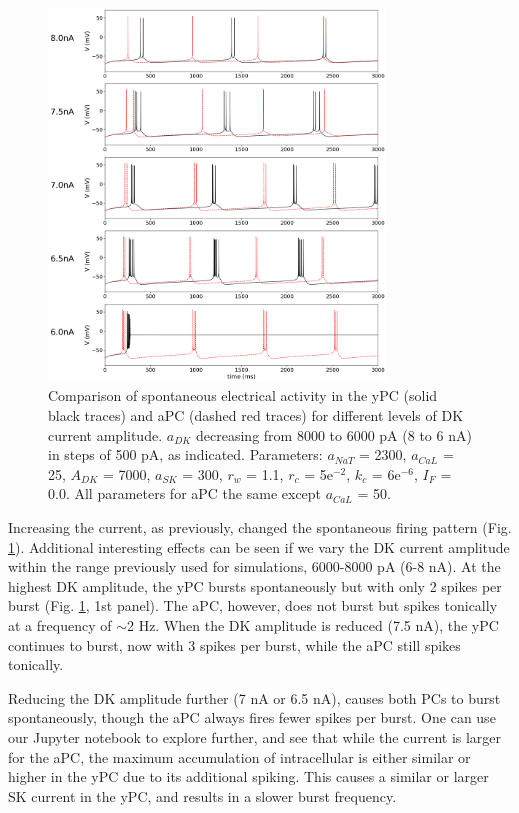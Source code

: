 \documentclass[12pt]{article}
\begin{document}
\begin{figure}[h!]
\centering
\includegraphics[width=0.8\textwidth]{figures/fig4.png}
\caption{Comparison of spontaneous electrical activity in the yPC (solid black traces) and aPC (dashed red traces) for different levels of DK current amplitude. $a_{DK}$ decreasing from 8000 to 6000 pA (8 to 6 nA) in steps of 500 pA, as indicated. Parameters: $a_{NaT}$ = 2300, $a_{CaL}$ = 25, $A_{DK}$ = 7000, $a_{SK}$ = 300, $r_{w}$ = 1.1, $r_{c}$ = 5e$^{-2}$, $k_{c}$ = 6e$^{-6}$, $I_{F}$ = 0.0. All parameters for aPC the same except $a_{CaL}$ = 50.}
\label{fig:burstingAging}
\end{figure}

Increasing the {\Ca} current, as previously, changed the spontaneous firing pattern (Fig. \ref{fig:burstingAging}). Additional interesting effects can be seen if we vary the DK current amplitude within the range previously used for simulations, 6000-8000 pA (6-8 nA). At the highest DK amplitude, the yPC bursts spontaneously but with only 2 spikes per burst (Fig. \ref{fig:burstingAging}, 1st panel). The aPC, however, does not burst but spikes tonically at a frequency of $\sim$2 Hz. When the DK amplitude is reduced (7.5 nA), the yPC continues to burst, now with 3 spikes per burst, while the aPC still spikes tonically. 

Reducing the DK amplitude further (7 nA or 6.5 nA), causes both PCs to burst spontaneously, though the aPC always fires fewer spikes per burst. One can use our Jupyter notebook to explore further, and see that while the {\Ca} current is larger for the aPC, the maximum accumulation of intracellular {\Ca} is either similar or higher in the yPC due to its additional spiking. This causes a similar or larger SK current in the yPC, and results in a slower burst frequency.
\end{document}
